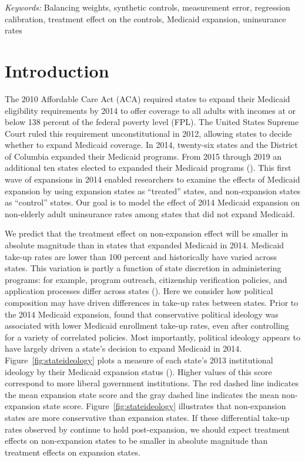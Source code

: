 \documentclass[12pt]{article}
\def\spacingset#1{\renewcommand{\baselinestretch}%
{#1}\small\normalsize} \spacingset{1}
\begin{document}
\noindent%
{\it Keywords:} Balancing weights, synthetic controls, measurement error, regression calibration, treatment effect on the controls, Medicaid expansion, uninsurance rates
\vfill

\newpage
\spacingset{1.45} %

\maketitle

\section{Introduction}

The 2010 Affordable Care Act (ACA) required states to expand their Medicaid eligibility requirements by 2014 to offer coverage to all adults with incomes at or below 138 percent of the federal poverty level (FPL). The United States Supreme Court ruled this requirement unconstitutional in 2012, allowing states to decide whether to expand Medicaid coverage. In 2014, twenty-six states and the District of Columbia expanded their Medicaid programs. From 2015 through 2019 an additional ten states elected to expanded their Medicaid programs (\cite{KFF}). This first wave of expansions in 2014 enabled researchers to examine the effects of Medicaid expansion by using expansion states as ``treated'' states, and non-expansion states as ``control'' states. Our goal is to model the effect of 2014 Medicaid expansion on non-elderly adult uninsurance rates among states that did not expand Medicaid.

We predict that the treatment effect on non-expansion effect will be smaller in absolute magnitude than in states that expanded Medicaid in 2014. Medicaid take-up rates are lower than 100 percent and historically have varied across states. This variation is partly a function of state discretion in administering programs: for example, program outreach, citizenship verification policies, and application processes differ across states (\cite{courtemanche2017early}). Here we consider how political composition may have driven differences in take-up rates between states. Prior to the 2014 Medicaid expansion, \cite{sommers2012understanding} found that conservative political ideology was associated with lower Medicaid enrollment take-up rates, even after controlling for a variety of correlated policies. Most importantly, political ideology appears to have largely driven a state's decision to expand Medicaid in 2014. Figure~\ref{fig:stateideology} plots a measure of each state's 2013 institutional ideology by their Medicaid expansion status (\cite{fording}). Higher values of this score correspond to more liberal government institutions. The red dashed line indicates the mean expansion state score and the gray dashed line indicates the mean non-expansion state score. Figure~\ref{fig:stateideology} illustrates that non-expansion states are more conservative than expansion states.  If these differential take-up rates observed by \cite{sommers2012understanding} continue to hold post-expansion, we should expect treatment effects on non-expansion states to be smaller in absolute magnitude than treatment effects on expansion states. 
\end{document}
